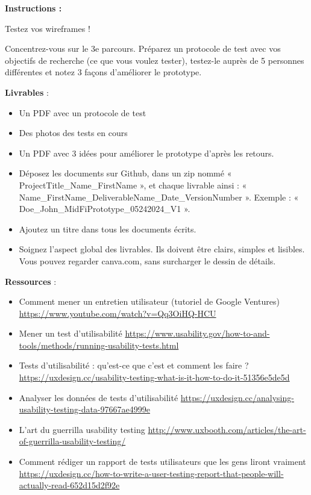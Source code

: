 \makeheaderfiles

\textbf{Instructions :}

Testez vos wireframes !

Concentrez-vous sur le 3e parcours. Préparez un protocole de test avec vos objectifs de recherche (ce que vous voulez tester), testez-le auprès de 5 personnes différentes et notez 3 façons d'améliorer le prototype.

\textbf{Livrables} :

\begin{itemize}
\item Un PDF avec un protocole de test
\item Des photos des tests en cours
\item Un PDF avec 3 idées pour améliorer le prototype d'après les retours.
\item Déposez les documents sur Github, dans un zip nommé « ProjectTitle\_Name\_FirstName », et chaque livrable ainsi : « Name\_FirstName\_DeliverableName\_Date\_VersionNumber ». Exemple : « Doe\_John\_MidFiPrototype\_05242024\_V1 ».
\item Ajoutez un titre dans tous les documents écrits.
\item Soignez l'aspect global des livrables. Ils doivent être clairs, simples et lisibles. Vous pouvez regarder canva.com, sans surcharger le dessin de détails.
\end{itemize}

\textbf{Ressources} :

\begin{itemize}
\item Comment mener un entretien utilisateur (tutoriel de Google Ventures) \url{https://www.youtube.com/watch?v=Qq3OiHQ-HCU}
\item Mener un test d'utilisabilité \url{https://www.usability.gov/how-to-and-tools/methods/running-usability-tests.html}
\item Tests d'utilisabilité : qu'est-ce que c'est et comment les faire ? \url{https://uxdesign.cc/usability-testing-what-is-it-how-to-do-it-51356e5de5d}
\item Analyser les données de tests d'utilisabilité \url{https://uxdesign.cc/analysing-usability-testing-data-97667ae4999e}
\item L'art du guerrilla usability testing \url{http://www.uxbooth.com/articles/the-art-of-guerrilla-usability-testing/}
\item Comment rédiger un rapport de tests utilisateurs que les gens liront vraiment \url{https://uxdesign.cc/how-to-write-a-user-testing-report-that-people-will-actually-read-652d15d2f92e}
\end{itemize}

